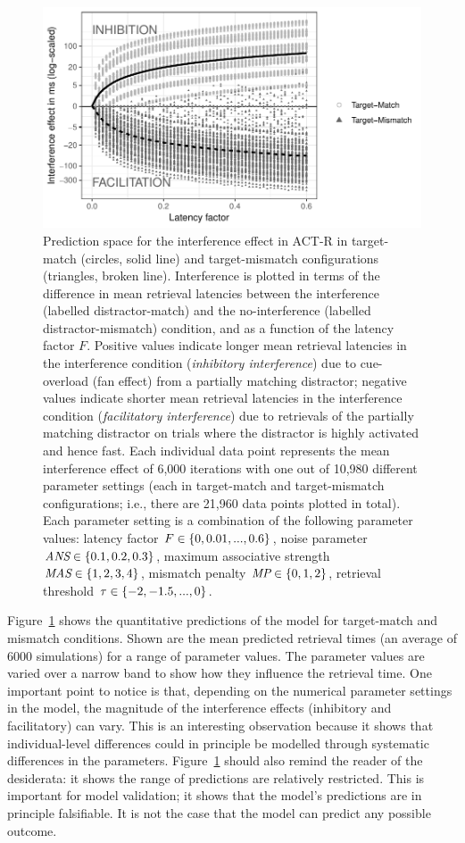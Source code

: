 \documentclass{cambridge7A}\usepackage[]{graphicx}\usepackage[]{color}
\begin{document}
\begin{figure}[htbp]
\centering
\includegraphics[width=.8\textwidth]{figures/fig-lv05plots1} 
\caption{Prediction space for the interference effect in ACT-R in target-match (circles, solid line) and target-mismatch configurations (triangles, broken line). Interference is plotted in terms of the difference in mean retrieval latencies between the interference (labelled distractor-match) and the no-interference (labelled distractor-mismatch) condition, and as a function of the latency factor $F$. Positive values indicate longer mean retrieval latencies in the interference condition (\emph{inhibitory interference}) due to cue-overload (fan effect) from a partially matching distractor; negative values indicate shorter mean retrieval latencies in the interference condition (\emph{facilitatory interference}) due to retrievals of the partially matching distractor on trials where the distractor is highly activated and hence fast. Each individual data point represents the mean interference effect of 6,000 iterations with one out of 10,980 different parameter settings (each in target-match and target-mismatch configurations; i.e., there are 21,960 data points plotted in total). Each parameter setting is a combination of the following parameter values: latency factor $\protect F \in \{0, 0.01, ..., 0.6\}$, noise parameter $\protect \textit{ANS} \in \{0.1, 0.2, 0.3\}$, maximum associative strength $\protect \textit{MAS} \in \{1,2,3,4\}$, mismatch penalty $\protect \textit{MP} \in \{0,1,2\}$, retrieval threshold $\protect \tau \in \{-2,-1.5,...,0\}$.}\label{fig:lv05plots}
\end{figure}

Figure~\ref{fig:lv05plots} shows the quantitative predictions of the model for target-match and mismatch conditions. Shown are the mean predicted retrieval times (an average of 6000 simulations) for a range of parameter values. The parameter values are varied over a narrow band to show how they influence the retrieval time. One important point to notice is that, depending on the numerical parameter settings in the model, the magnitude of the interference effects (inhibitory and facilitatory) can vary. This is an interesting observation because it shows that individual-level differences could in principle be modelled through systematic differences in the parameters. Figure~\ref{fig:lv05plots} should also remind the reader of the \cite{rp} desiderata: it shows the range of predictions are relatively restricted. This is important for model validation; it shows that the model's predictions are in principle falsifiable. It is not the case that the model can predict any possible outcome.
\end{document}
